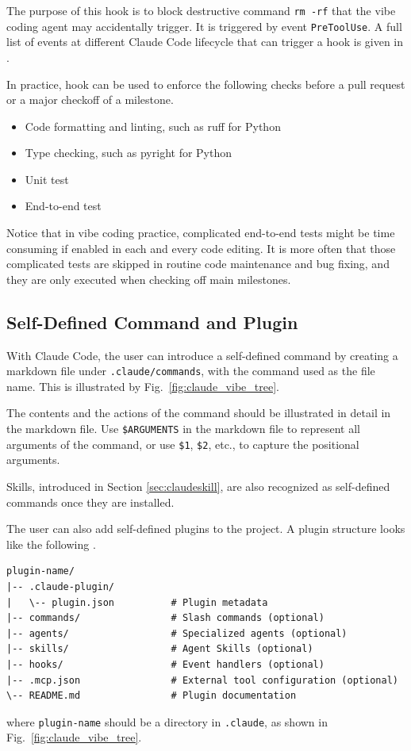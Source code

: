 The purpose of this hook is to block destructive command \verb|rm -rf| that the vibe coding agent may accidentally trigger. It is triggered by event \verb|PreToolUse|. A full list of events at different Claude Code lifecycle that can trigger a hook is given in \cite{claudeCode2026hooks}.

In practice, hook can be used to enforce the following checks before a pull request or a major checkoff of a milestone.
\begin{itemize}
  \item Code formatting and linting, such as ruff for Python
  \item Type checking, such as pyright for Python
  \item Unit test
  \item End-to-end test
\end{itemize}
Notice that in vibe coding practice, complicated end-to-end tests might be time consuming if enabled in each and every code editing. It is more often that those complicated tests are skipped in routine code maintenance and bug fixing, and they are only executed when checking off main milestones.

\subsection{Self-Defined Command and Plugin}

With Claude Code, the user can introduce a self-defined command by creating a markdown file under \verb|.claude/commands|, with the command used as the file name. This is illustrated by Fig.~\ref{fig:claude_vibe_tree}.
 
The contents and the actions of the command should be illustrated in detail in the markdown file. Use \verb|$ARGUMENTS| in the markdown file to represent all arguments of the command, or use \verb|$1|, \verb|$2|, etc., to capture the positional arguments.

Skills, introduced in Section \ref{sec:claudeskill}, are also recognized as self-defined commands once they are installed.

The user can also add self-defined plugins to the project. A plugin structure looks like the following \cite{anthropic2026claudeCodePlugins}.
\begin{lstlisting}
plugin-name/
|-- .claude-plugin/
|   \-- plugin.json          # Plugin metadata
|-- commands/                # Slash commands (optional)
|-- agents/                  # Specialized agents (optional)
|-- skills/                  # Agent Skills (optional)
|-- hooks/                   # Event handlers (optional)
|-- .mcp.json                # External tool configuration (optional)
\-- README.md                # Plugin documentation
\end{lstlisting}
where \verb|plugin-name| should be a directory in \verb|.claude|, as shown in Fig.~\ref{fig:claude_vibe_tree}.

